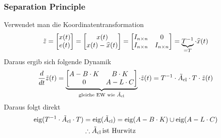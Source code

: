     \subsubsection{Separation Principle}
        Verwendet man die Koordinatentransformation
        \begin{equation*}
            \Tilde{z} = 
            \begin{bmatrix}
            x(t)\\e(t)
            \end{bmatrix}
            =
            \begin{bmatrix}
            x(t)\\x(t)-\widehat{x}(t)
            \end{bmatrix}
            =
            \begin{bmatrix}
            I_{n\times n} & 0\\I_{n\times n} & I_{n\times n}
            \end{bmatrix}
            = \underbrace{T^{-1}}_{=T}\cdot\widehat{x}(t)
        \end{equation*}
        Daraus ergib sich folgende Dynamik
        \begin{equation*} 
            \frac{d}{dt}\Tilde{z}(t) = 
            \underbrace{\begin{bmatrix}
            A-B\cdot K   &   B\cdot K\\
            0 & A-L\cdot C
            \end{bmatrix}}_{\textnormal{gleiche EW wie }\Tilde{A}_{\textnormal{cl}}}
            \cdot\Tilde{z}(t) = T^{-1}\cdot\Tilde{A}_\textnormal{cl}\cdot T\cdot\Tilde{z}(t)
        \end{equation*}
        Daraus folgt direkt
        \begin{align*}
            \operatorname{eig}(T^{-1}\cdot\Tilde{A}_\textnormal{cl}\cdot T) &= \operatorname{eig}(\Tilde{A}_\textnormal{cl}) = \operatorname{eig}(A-B\cdot K)\cup \operatorname{eig}(A-L\cdot C)\\ 
            &\therefore \Tilde{A}_\textnormal{cl}\,\textnormal{ist Hurwitz}
        \end{align*}